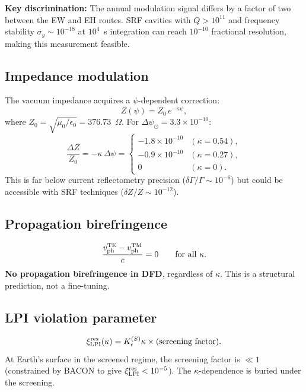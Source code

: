 \documentclass[11pt,a4paper]{article}
\theoremstyle{definition}
\begin{document}
\textbf{Key discrimination:} The annual modulation signal differs by
a factor of two between the EW and EH routes.  SRF cavities with
$Q > 10^{11}$ and frequency stability $\sigma_y \sim 10^{-18}$ at
$10^4$~s integration can reach $10^{-10}$ fractional resolution,
making this measurement feasible.

\subsection{Impedance modulation}

The vacuum impedance acquires a $\psi$-dependent correction:
\begin{equation}
Z(\psi) = Z_0\,e^{-\kappa\psi},
\end{equation}
where $Z_0 = \sqrt{\mu_0/\epsilon_0} = 376.73$~$\Omega$.
For $\Delta\psi_\odot = 3.3 \times 10^{-10}$:
\begin{equation}
\frac{\Delta Z}{Z_0} = -\kappa\,\Delta\psi
= \begin{cases}
-1.8 \times 10^{-10} & (\kappa = 0.54), \\
-0.9 \times 10^{-10} & (\kappa = 0.27), \\
0 & (\kappa = 0).
\end{cases}
\end{equation}
This is far below current reflectometry precision
($\delta\Gamma/\Gamma \sim 10^{-6}$) but could be accessible
with SRF techniques ($\delta Z/Z \sim 10^{-12}$).

\subsection{Propagation birefringence}

\begin{equation}
\frac{v_{\rm ph}^{\rm TE} - v_{\rm ph}^{\rm TM}}{c} = 0
\qquad \text{for all }\kappa.
\end{equation}
\textbf{No propagation birefringence in DFD}, regardless of
$\kappa$.  This is a structural prediction, not a fine-tuning.

\subsection{LPI violation parameter}

\begin{equation}
\xi_{\rm LPI}^{\rm res}(\kappa) = K_\epsilon^{(S)}\kappa
\times (\text{screening factor}).
\end{equation}
At Earth's surface in the screened regime, the screening
factor is $\ll 1$ (constrained by BACON to give
$\xi_{\rm LPI}^{\rm res} < 10^{-5}$).  The
$\kappa$-dependence is buried under the screening.
\end{document}
